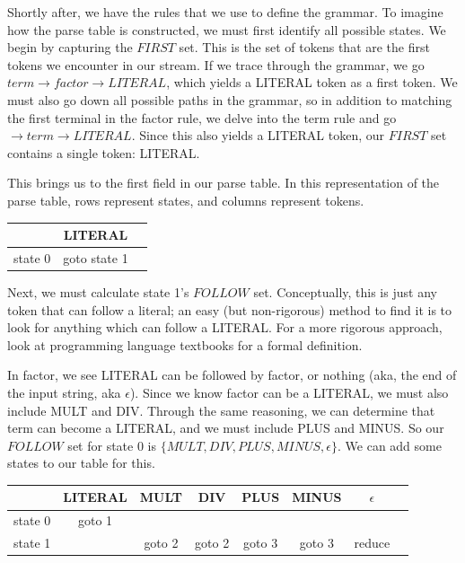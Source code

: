 \documentclass[]{article}
\begin{document}
Shortly after, we have the rules that we use to define the grammar.
To imagine how the parse table is constructed, we must first identify all possible states.
We begin by capturing the $FIRST$ set.
This is the set of tokens that are the first tokens we encounter in our stream.
If we trace through the grammar, we go $term \rightarrow factor \rightarrow LITERAL$, which yields a LITERAL token as a first token.
We must also go down all possible paths in the grammar, so in addition to matching the first terminal in the factor rule, we delve into the term rule and go $\rightarrow term \rightarrow LITERAL$.
Since this also yields a LITERAL token, our $FIRST$ set contains a single token: LITERAL.

This brings us to the first field in our parse table.
In this representation of the parse table, rows represent states, and columns represent tokens.

\begin{center}
	\begin{tabular}{| c | c | c |}
		\hline
		& LITERAL      & \\
		\hline
		state 0 & goto state 1 & \\
		\hline
	\end{tabular}
\end{center}

Next, we must calculate state 1's $FOLLOW$ set.
Conceptually, this is just any token that can follow a literal; an easy (but non-rigorous) method to find it is to look for anything which can follow a LITERAL.
For a more rigorous approach, look at programming language textbooks for a formal definition.

In factor, we see LITERAL can be followed by factor, or nothing (aka, the end of the input string, aka $\epsilon$).
Since we know factor can be a LITERAL, we must also include MULT and DIV.
Through the same reasoning, we can determine that term can become a LITERAL, and we must include PLUS and MINUS.
So our $FOLLOW$ set for state 0 is $\{MULT, DIV, PLUS, MINUS, \epsilon\}$.
We can add some states to our table for this.

\begin{center}
	\begin{tabular}{| c | c | c | c | c | c | c | c |}
		\hline
		& LITERAL      & MULT & DIV & PLUS & MINUS & $\epsilon$ \\
		\hline
		state 0 & goto 1 & & & & & \\
		state 1 &  & goto 2 & goto 2 & goto 3 & goto 3 & reduce \\
		\hline
	\end{tabular}
\end{center}
\end{document}
